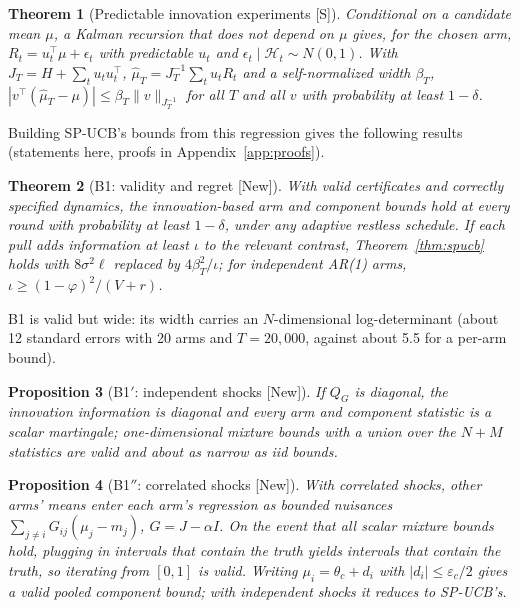 \documentclass[11pt]{article}
\newtheorem{theorem}{Theorem}
\newtheorem{proposition}[theorem]{Proposition}
\theoremstyle{definition}
\theoremstyle{remark}
\newcommand{\src}[1]{\textsf{[#1]}}
\begin{document}
\begin{theorem}[Predictable innovation experiments \src{S}]\label{thm:innov}
Conditional on a candidate mean $\mu$, a Kalman recursion that does not depend on $\mu$ gives, for the chosen arm, $R_t=u_t^\top\mu+\epsilon_t$ with predictable $u_t$ and $\epsilon_t\mid\mathcal H_t\sim N(0,1)$. With $J_T=H+\sum_tu_tu_t^\top$, $\hat\mu_T=J_T^{-1}\sum_tu_tR_t$ and a self-normalized width $\beta_T$, $|v^\top(\hat\mu_T-\mu)|\le\beta_T\|v\|_{J_T^{-1}}$ for all $T$ and all $v$ with probability at least $1-\delta$.
\end{theorem}

Building SP-UCB's bounds from this regression gives the following results (statements here, proofs in Appendix~\ref{app:proofs}).

\begin{theorem}[B1: validity and regret \src{New}]\label{thm:b1}
With valid certificates and correctly specified dynamics, the innovation-based arm and component bounds hold at every round with probability at least $1-\delta$, under any adaptive restless schedule. If each pull adds information at least $\iota$ to the relevant contrast, Theorem~\ref{thm:spucb} holds with $8\sigma^2\ell$ replaced by $4\beta_T^2/\iota$; for independent AR(1) arms, $\iota\ge(1-\varphi)^2/(V+r)$.
\end{theorem}

B1 is valid but wide: its width carries an $N$-dimensional log-determinant (about 12 standard errors with 20 arms and $T=20{,}000$, against about 5.5 for a per-arm bound).

\begin{proposition}[B1$'$: independent shocks \src{New}]\label{prop:b1p}
If $Q_G$ is diagonal, the innovation information is diagonal and every arm and component statistic is a scalar martingale; one-dimensional mixture bounds with a union over the $N+M$ statistics are valid and about as narrow as iid bounds.
\end{proposition}

\begin{proposition}[B1$''$: correlated shocks \src{New}]\label{prop:b1pp}
With correlated shocks, other arms' means enter each arm's regression as bounded nuisances $\sum_{j\ne i}G_{ij}(\mu_j-m_j)$, $G=J-\alpha I$. On the event that all scalar mixture bounds hold, plugging in intervals that contain the truth yields intervals that contain the truth, so iterating from $[0,1]$ is valid. Writing $\mu_i=\theta_c+d_i$ with $|d_i|\le\varepsilon_c/2$ gives a valid pooled component bound; with independent shocks it reduces to SP-UCB's.
\end{proposition}
\end{document}
